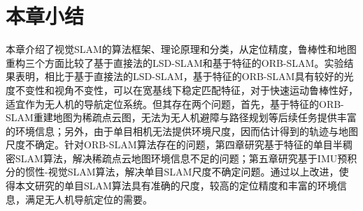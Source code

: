 \section{本章小结}
本章介绍了视觉SLAM的算法框架、理论原理和分类，从定位精度，鲁棒性和地图重构三个方面比较了基于直接法的LSD-SLAM和基于特征的ORB-SLAM。实验结果表明，相比于基于直接法的LSD-SLAM，基于特征的ORB-SLAM具有较好的光度不变性和视角不变性，可以在宽基线下稳定匹配特征，对于快速运动鲁棒性好，适宜作为无人机的导航定位系统。但其存在两个问题，首先，基于特征的ORB-SLAM重建地图为稀疏点云图，无法为无人机避障与路径规划等后续任务提供丰富的环境信息；另外，由于单目相机无法提供环境尺度，因而估计得到的轨迹与地图尺度不确定。针对ORB-SLAM算法存在的问题，第四章研究基于特征的单目半稠密SLAM算法，解决稀疏点云地图环境信息不足的问题；第五章研究基于IMU预积分的惯性-视觉SLAM算法，解决单目SLAM尺度不确定问题。通过以上改进，使得本文研究的单目SLAM算法具有准确的尺度，较高的定位精度和丰富的环境信息，满足无人机导航定位的需要。


